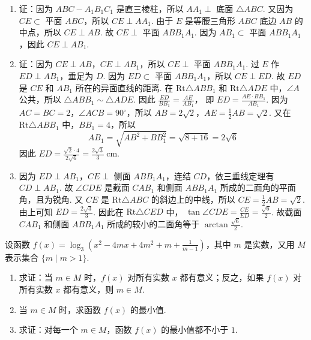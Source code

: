 \begin{solution}
\begin{enumerate}
\item 证：因为 \(ABC-A_1B_1C_1\) 是直三棱柱，所以 \(AA_{1}\perp\) 底面 \(\triangle ABC\). 又因为 \(CE \subset\) 平面 \(ABC\)，所以 \(CE \perp AA_{1}\). 由于 \(E\) 是等腰三角形 \(ABC\) 底边 \(AB\) 的中点，所以 \(CE \perp AB\). 故 \(CE \perp\) 平面 \(ABB_1A_1\). 因为 \(AB_1 \subset\) 平面 \(ABB_1A_1\)，因此 \(CE \perp AB_1\).

\item 证：因为 \(CE \perp AB\)，\(CE \perp AB_{1}\)，所以 \(CE \perp\) 平面 \(ABB_{1}A_{1}\). 过 \(E\) 作 \(ED \perp AB_1\)，垂足为 \(D\). 因为 \(ED \subset\) 平面 \(ABB_1A_1\)，所以 \(CE \perp ED\). 故 \(ED\) 是 \(CE\) 和 \(AB_{1}\) 所在的异面直线的距离.
在 \(\mathrm{Rt}\triangle ABB_1\) 和 \(\mathrm{Rt}\triangle ADE\) 中，\(\angle A\) 公共，所以 \(\triangle ABB_1 \sim \triangle ADE\). 因此
\(\frac{ED}{BB_1} = \frac{AE}{AB_1}\)，
即
\(ED = \frac{AE \cdot BB_1}{AB_1}\).
因为 \(AC=BC=2\)，\(\angle ACB=90^{\circ}\)，所以 \(AB=2\sqrt{2}\)，\(AE=\frac{1}{2}AB=\sqrt{2}\).
又在 \(\mathrm{Rt}\triangle ABB_1\) 中，\(BB_1 = 4\)，所以
\[
AB_1 = \sqrt{AB^2 + BB_1^2} = \sqrt{8 + 16} = 2\sqrt{6}
\]
因此
\(ED=\frac{\sqrt{2}\cdot 4}{2\sqrt{6}}=\frac{2\sqrt{3}}{3}\mathrm{~cm}\).

\item 因为 \(ED\perp AB_1\)，\(CE\perp\) 侧面 \(ABB_1A_1\)，连结 \(CD\)，依三垂线定理有 \(CD\perp AB_1\). 故 \(\angle CDE\) 是截面 \(CAB_1\) 和侧面 \(ABB_1A_1\) 所成的二面角的平面角，且为锐角. 又 \(CE\) 是 \(\mathrm{Rt}\triangle ABC\) 的斜边上的中线，所以 \(CE=\frac{1}{2}AB=\sqrt{2}\). 由上可知 \(ED=\frac{2\sqrt{3}}{3}\). 因此在 \(\mathrm{Rt}\triangle CED\) 中，
\(\tan\angle CDE=\frac{CE}{ED}=\frac{\sqrt{6}}{2}\).
故截面 \(CAB_{1}\) 和侧面 \(ABB_{1}A_{1}\) 所成的较小的二面角等于 \(\arctan\frac{\sqrt{6}}{2}\).
\end{enumerate}
\end{solution}

\begin{problem}

设函数 \(f(x)=\log_{3}\left(x^{2}-4mx+4m^{2}+m+\frac{1}{m-1}\right) \)，其中 \(m\) 是实数，又用 \(M\) 表示集合 \(\{m \mid m>1\} \).

\begin{enumerate}
\item 求证：当 \(m \in M \) 时，\(f(x)\) 对所有实数 \(x\) 都有意义；反之，如果 \(f(x)\) 对所有实数 \(x\) 都有意义，则 \(m \in M\).
\item 当 \(m \in M \) 时，求函数 \(f(x)\) 的最小值.
\item 求证：对每一个 \(m \in M \)，函数 \(f(x)\) 的最小值都不小于 \(1\).
\end{enumerate}
\end{problem}


